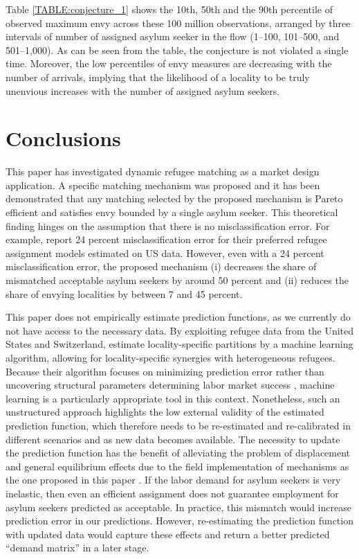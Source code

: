 \documentclass[12pt,fleqn]{article}
\begin{document}
Table \ref{TABLE:conjecture_1} shows the 10th, 50th and the 90th percentile of observed maximum envy across these 100 million observations, arranged by three intervals of number of assigned asylum seeker in the flow (1--100, 101--500, and 501--1,000). As can be seen from the table, the conjecture is not violated a single time. Moreover, the low percentiles of envy measures are decreasing with the number of arrivals, implying that the likelihood of a locality to be truly unenvious increases with the number of assigned asylum seekers.


\section{Conclusions}\label{SEC:conclusions}
This paper has investigated dynamic refugee matching as a market design application. A specific matching mechanism was proposed and it has been demonstrated that any matching selected by the proposed mechanism is Pareto efficient and satisfies envy bounded by a single asylum seeker. This theoretical finding hinges on the assumption that there is no misclassification error. For example, \cite{bib:BansakEtAl} report 24 percent misclassification error for their preferred refugee assignment models estimated on US data. However, even with a 24 percent misclassification error, the proposed mechanism (i) decreases the share of mismatched acceptable asylum seekers by around 50 percent and (ii) reduces the share of envying localities by between 7 and 45 percent.

This paper does not empirically estimate prediction functions, as we currently do not have access to the necessary data. By exploiting refugee data from the United States and Switzerland, \cite{bib:BansakEtAl} estimate locality-specific partitions by a machine learning algorithm, allowing for locality-specific synergies with heterogeneous refugees. Because their algorithm focuses on minimizing prediction error rather than uncovering structural parameters determining labor market success \citep{bib:MullainathanSpiess}, machine learning is a particularly appropriate tool in this context. Nonetheless, such an unstructured approach highlights the low external validity of the estimated prediction function, which therefore needs to be re-estimated and re-calibrated in different scenarios and as new data becomes available. The necessity to update the prediction function has the benefit of alleviating the problem of displacement and general equilibrium effects due to the field implementation of mechanisms as the one proposed in this paper \citep{bib:CreponEtAl}. If the labor demand for asylum seekers is very inelastic, then even an efficient assignment does not guarantee employment for asylum seekers predicted as acceptable. In practice, this mismatch would increase prediction error in our predictions. However, re-estimating the prediction function with updated data would capture these effects and return a better predicted ``demand matrix'' in a later stage.
\end{document}
